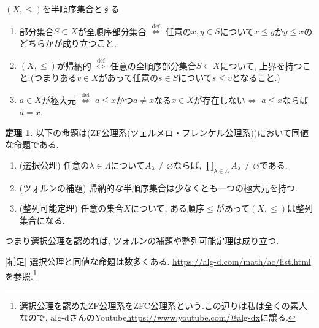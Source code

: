 \documentclass[dvipdfmx,a4paper,11pt]{article}
\theoremstyle{definition}
\newtheorem{thm}{定理}
\begin{document}
\begin{tcolorbox}[
    colback = white,
    colframe = black!35!black,
    fonttitle = \bfseries,
    breakable = true]
$(X, \le)$を半順序集合とする
    \begin{enumerate}
    \setlength{\parskip}{0cm} 
  \setlength{\itemsep}{0cm} 
\item 部分集合$S \subset X$が全順序部分集合 $\stackrel{\mathrm{def}}{\Longleftrightarrow}$  任意の$x, y \in S$について$x \le y$か$y \le x$のどちらかが成り立つこと.
\item $(X, \le)$が帰納的 $\stackrel{\mathrm{def}}{\Longleftrightarrow}$  任意の全順序部分集合$S \subset X$について, 上界を持つこと.(つまりある$v \in X$があって任意の$s \in S$について$s \le v$となること.)
\item $a \in X$が極大元 $\stackrel{\mathrm{def}}{\Longleftrightarrow}$ $a \le x$かつ$a \neq x$なる$x \in X$が存在しない$\stackrel{}{\Longleftrightarrow}$ $a \le x$ならば$a=x$.
   \end{enumerate}
 \end{tcolorbox}
 
 
 
\begin{tcolorbox}[
    colback = white,
    colframe = black!35!black,
    fonttitle = \bfseries,
    breakable = true]
    \begin{thm}
以下の命題は(ZF公理系(ツェルメロ・フレンケル公理系))において同値な命題である. 
    \begin{enumerate}[label=(\arabic*).]
    \setlength{\parskip}{0cm} 
  \setlength{\itemsep}{0cm} 
  \item (選択公理) 任意の$\lambda \in \Lambda$について$A_{\lambda} \neq \varnothing$ならば, $\prod_{\lambda \in \Lambda} A_{\lambda} \neq \varnothing$である. 
  \item (ツォルンの補題) 帰納的な半順序集合は少なくとも一つの極大元を持つ. 
  \item (整列可能定理) 任意の集合$X$について, ある順序$\le$があって$(X,\le)$は整列集合になる. 
  \end{enumerate}
    \end{thm}
    つまり選択公理を認めれば, ツォルンの補題や整列可能定理は成り立つ. 
 \end{tcolorbox}
 
[補足] 選択公理と同値な命題は数多くある. \url{https://alg-d.com/math/ac/list.html}
を参照.\footnote{選択公理を認めたZF公理系をZFC公理系という.この辺りは私は全くの素人なので, alg-dさんのYoutube\url{https://www.youtube.com/@alg-dx}に譲る.}%
\end{document}
